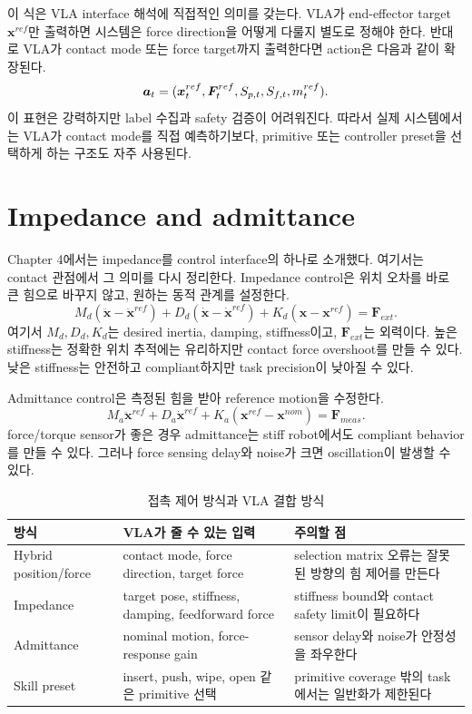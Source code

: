 이 식은 VLA interface 해석에 직접적인 의미를 갖는다. VLA가 end-effector target $\bm{x}^{ref}$만 출력하면 시스템은 force direction을 어떻게 다룰지 별도로 정해야 한다. 반대로 VLA가 contact mode 또는 force target까지 출력한다면 action은 다음과 같이 확장된다.
\begin{equation}
  \bm{a}_t =
  (\bm{x}^{ref}_t,\bm{F}^{ref}_t,S_{p,t},S_{f,t},m_t^{ref}).
  \label{eq:vla-contact-action}
\end{equation}
이 표현은 강력하지만 label 수집과 safety 검증이 어려워진다. 따라서 실제 시스템에서는 VLA가 contact mode를 직접 예측하기보다, primitive 또는 controller preset을 선택하게 하는 구조도 자주 사용된다.

\section{Impedance and admittance}

Chapter 4에서는 impedance를 control interface의 하나로 소개했다. 여기서는 contact 관점에서 그 의미를 다시 정리한다. Impedance control은 위치 오차를 바로 큰 힘으로 바꾸지 않고, 원하는 동적 관계를 설정한다.
\begin{equation}
  M_d(\ddot{\bm{x}}-\ddot{\bm{x}}^{ref})
  +
  D_d(\dot{\bm{x}}-\dot{\bm{x}}^{ref})
  +
  K_d(\bm{x}-\bm{x}^{ref})
  =
  \bm{F}_{ext}.
  \label{eq:desired-impedance}
\end{equation}
여기서 $M_d,D_d,K_d$는 desired inertia, damping, stiffness이고, $\bm{F}_{ext}$는 외력이다. 높은 stiffness는 정확한 위치 추적에는 유리하지만 contact force overshoot를 만들 수 있다. 낮은 stiffness는 안전하고 compliant하지만 task precision이 낮아질 수 있다.

Admittance control은 측정된 힘을 받아 reference motion을 수정한다.
\begin{equation}
  M_a\ddot{\bm{x}}^{ref}
  +
  D_a\dot{\bm{x}}^{ref}
  +
  K_a(\bm{x}^{ref}-\bm{x}^{nom})
  =
  \bm{F}_{meas}.
  \label{eq:admittance}
\end{equation}
force/torque sensor가 좋은 경우 admittance는 stiff robot에서도 compliant behavior를 만들 수 있다. 그러나 force sensing delay와 noise가 크면 oscillation이 발생할 수 있다.

\begin{table}[ht]
\centering
\caption{접촉 제어 방식과 VLA 결합 방식}
\label{tab:contact-control-vla}
\small
\begin{tabularx}{\textwidth}{p{28mm}X X}
\toprule
방식 & VLA가 줄 수 있는 입력 & 주의할 점 \\
\midrule
Hybrid position/force & contact mode, force direction, target force & selection matrix 오류는 잘못된 방향의 힘 제어를 만든다 \\
Impedance & target pose, stiffness, damping, feedforward force & stiffness bound와 contact safety limit이 필요하다 \\
Admittance & nominal motion, force-response gain & sensor delay와 noise가 안정성을 좌우한다 \\
Skill preset & insert, push, wipe, open 같은 primitive 선택 & primitive coverage 밖의 task에서는 일반화가 제한된다 \\
\bottomrule
\end{tabularx}
\end{table}

